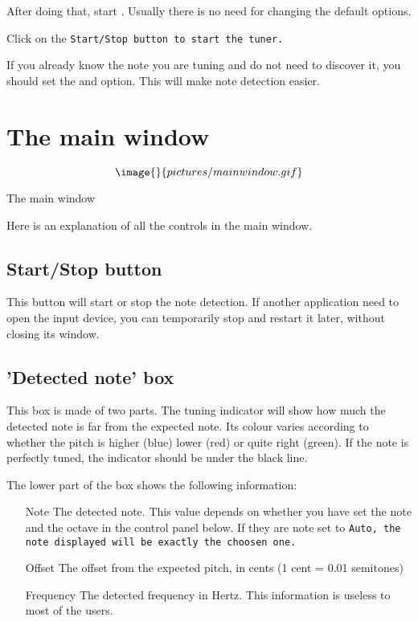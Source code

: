 After doing that, start . Usually there is
no need for changing the default options.

Click on the \tt{Start/Stop} button to start the tuner.

If you already know the note you are tuning and do not need to
discover it, you should set the  and
 option.
This will make note detection easier.

\section{The main window}\label{mainwindow}

$$\image{}{pictures/mainwindow.gif}$$
\caption{The main window}

Here is an explanation of all the controls in the main window.

\subsection{Start/Stop button}\label{startstop}

This button will start or stop the note detection. If another
application need to open the input device, you can temporarily
stop  and restart it later, without closing its
window.

\subsection{'Detected note' box}\label{detectednote}

This box is made of two parts. The tuning indicator will show
how much the detected note is far from the expected note. Its
colour varies according to whether the pitch is higher (blue)
lower (red) or quite right (green). If the note is perfectly
tuned, the indicator should be under the black line.

The lower part of the box shows the following information:
\begin{itemize}
\item[Note] The detected note. This value depends on whether you
have set the note and the octave in the control panel below. If
they are note set to \tt{Auto}, the note displayed will be exactly
the choosen one.
\item[Offset] The offset from the expected pitch, in cents (1 cent = 
0.01 semitones)
\item[Frequency] The detected frequency in Hertz. This information is
useless to most of the users.
\end{itemize}

